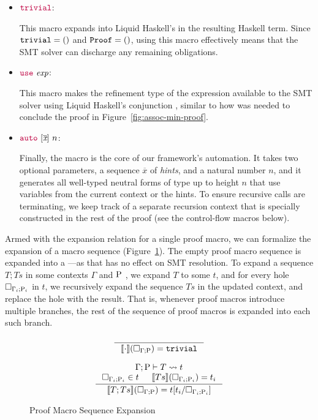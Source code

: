\begin{itemize}

\item ${\color{purple}\mathtt{trivial}}$:

  This macro expands into Liquid Haskell's  in
  the resulting Haskell term. Since $\mathtt{trivial} = \mathtt{()}$ and
  $\mathtt{Proof} = \mathtt{()}$, using this macro effectively means that the
  SMT solver can discharge any remaining obligations.

\item ${\color{purple}\mathtt{use}} ~ \textit{exp}$:

  This macro makes the refinement type of the expression available to
  the SMT solver using Liquid Haskell's conjunction \LC{&&&}, similar
  to how  was needed to conclude the proof in
  Figure~\ref{fig:assoc-min-proof}.
  
\item ${\color{purple}\mathtt{auto}} ~ [\overline{\textit{x}}] ~ n$:

  Finally, the  macro is the core of our framework's
  automation.  It takes two optional parameters, a sequence
  $\overline{\textit{x}}$ of {\em hints}, and a natural number $n$,
  and it generates all well-typed neutral forms of type  up
  to height $n$ that use variables from the current context or the
  hints. To ensure recursive calls are terminating, we keep track of a
  separate recursion context that is specially constructed in the rest
  of the proof (see the control-flow macros below).
\end{itemize}

Armed with the expansion relation for a single proof macro, we can
formalize the expansion of a macro sequence
(Figure~\ref{fig:sequence-semantics}). The empty proof macro sequence
is expanded into a ---as that has no effect on SMT
resolution. To expand a sequence $T; Ts$ in some contexts $\Gamma$ and
$\mathrm{P}$ , we expand $T$ to some \LangBTerm $t$, and for every hole
$\Box_{\Gamma_i ; \mathrm{P}_i}$ in $t$, we recursively expand the
sequence $Ts$ in the updated context, and replace the hole with the
result.  That is, whenever proof macros introduce multiple branches,
the rest of the sequence of proof macros is expanded into each such
branch.

\begin{figure}
  \[
  \begin{array}{c}
  \inference{}{\Sem{\cdot}{\macroHole{\Gamma}{\Rho}}{\MC{trivial}}}\\
\\    
  \inference
      { \Expand{\Gamma}{\Rho}{T}{t}\\
            \macroHole{\Gamma_i}{\Rho_i} \in t && 
            \Sem{Ts}{\macroHole{\Gamma_i}{\Rho_i}}{t_i}
          }
      { \Sem{T;Ts}{\macroHole{\Gamma}{\Rho}}{t[t_i/\macroHole{\Gamma_i}{\Rho_i}]}}
  \end{array}
  \]
  \caption{Proof Macro Sequence Expansion}
  \label{fig:sequence-semantics}
\end{figure}

